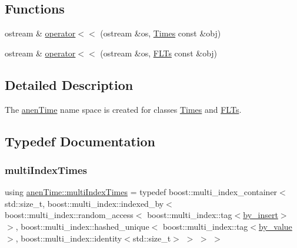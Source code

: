 \subsection*{Functions}
\begin{DoxyCompactItemize}
\item 
ostream \& \mbox{\hyperlink{namespaceanen_time_ab90a5dd8a6a0a1bd15220276fe8043b7}{operator$<$$<$}} (ostream \&os, \mbox{\hyperlink{classanen_time_1_1_times}{Times}} const \&obj)
\item 
ostream \& \mbox{\hyperlink{namespaceanen_time_a51b4045300f072275ce700d5b3362ca6}{operator$<$$<$}} (ostream \&os, \mbox{\hyperlink{classanen_time_1_1_f_l_ts}{F\+L\+Ts}} const \&obj)
\end{DoxyCompactItemize}


\subsection{Detailed Description}
The \mbox{\hyperlink{namespaceanen_time}{anen\+Time}} name space is created for classes \mbox{\hyperlink{classanen_time_1_1_times}{Times}} and \mbox{\hyperlink{classanen_time_1_1_f_l_ts}{F\+L\+Ts}}. 

\subsection{Typedef Documentation}
\mbox{\label{namespaceanen_time_a235ffbd1f772e49b036a80c4bd766f90}} 
\subsubsection{\texorpdfstring{multi\+Index\+Times}{multiIndexTimes}}
{\footnotesize\ttfamily using \mbox{\hyperlink{namespaceanen_time_a235ffbd1f772e49b036a80c4bd766f90}{anen\+Time\+::multi\+Index\+Times}} = typedef boost\+::multi\+\_\+index\+\_\+container$<$ std\+::size\+\_\+t, boost\+::multi\+\_\+index\+::indexed\+\_\+by$<$ boost\+::multi\+\_\+index\+::random\+\_\+access$<$ boost\+::multi\+\_\+index\+::tag$<$\mbox{\hyperlink{structanen_time_1_1by__insert}{by\+\_\+insert}}$>$ $>$, boost\+::multi\+\_\+index\+::hashed\+\_\+unique$<$ boost\+::multi\+\_\+index\+::tag$<$\mbox{\hyperlink{structanen_time_1_1by__value}{by\+\_\+value}}$>$, boost\+::multi\+\_\+index\+::identity$<$std\+::size\+\_\+t$>$ $>$ $>$ $>$}

